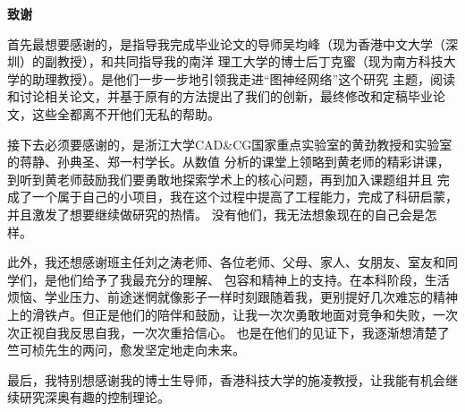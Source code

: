 \cleardoublepage{}

\begin{center}
    \bfseries {} 致谢
\end{center}

首先最想要感谢的，是指导我完成毕业论文的导师吴均峰（现为香港中文大学（深圳）的副教授），和共同指导我的南洋
理工大学的博士后丁克蜜（现为南方科技大学的助理教授）。是他们一步一步地引领我走进“图神经网络”这个研究
主题，阅读和讨论相关论文，并基于原有的方法提出了我们的创新，最终修改和定稿毕业论文，这些全都离不开他们无私的帮助。

接下去必须要感谢的，是浙江大学CAD\&CG国家重点实验室的黄劲教授和实验室的蒋静、孙典圣、郑一村学长。从数值
分析的课堂上领略到黄老师的精彩讲课，到听到黄老师鼓励我们要勇敢地探索学术上的核心问题，再到加入课题组并且
完成了一个属于自己的小项目，我在这个过程中提高了工程能力，完成了科研启蒙，并且激发了想要继续做研究的热情。
没有他们，我无法想象现在的自己会是怎样。

此外，我还想感谢班主任刘之涛老师、各位老师、父母、家人、女朋友、室友和同学们，是他们给予了我最充分的理解、
包容和精神上的支持。在本科阶段，生活烦恼、学业压力、前途迷惘就像影子一样时刻跟随着我，更别提好几次难忘的精神
上的滑铁卢。但正是他们的陪伴和鼓励，让我一次次勇敢地面对竞争和失败，一次次正视自我反思自我，一次次重拾信心。
也是在他们的见证下，我逐渐想清楚了竺可桢先生的两问，愈发坚定地走向未来。

最后，我特别想感谢我的博士生导师，香港科技大学的施凌教授，让我能有机会继续研究深奥有趣的控制理论。    